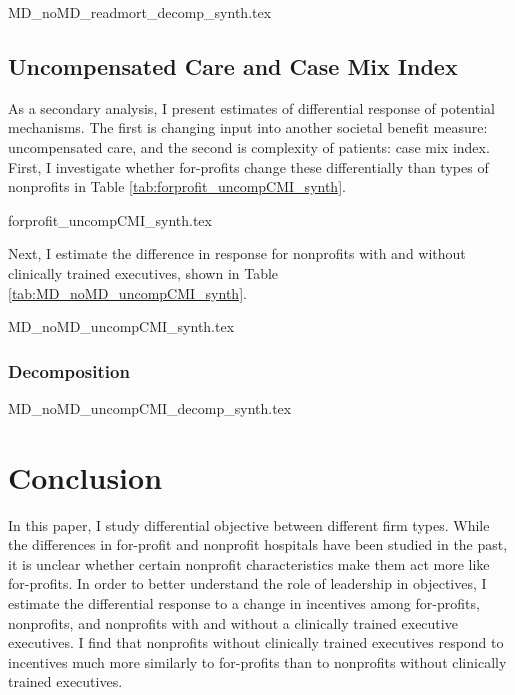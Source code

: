 \documentclass[12pt]{article}
\begin{document}
    {MD_noMD_readmort_decomp_synth.tex}

     


    \subsection{Uncompensated Care and Case Mix Index}

    As a secondary analysis, I present estimates of differential response of potential mechanisms. The first is changing input into another societal benefit measure: uncompensated care, and the second is complexity of patients: case mix index. First, I investigate whether for-profits change these differentially than types of nonprofits in Table \ref{tab:forprofit_uncompCMI_synth}. 

    {forprofit_uncompCMI_synth.tex}

    Next, I estimate the difference in response for nonprofits with and without clinically trained executives, shown in Table \ref{tab:MD_noMD_uncompCMI_synth}. 

    {MD_noMD_uncompCMI_synth.tex}

    \subsubsection{Decomposition}

    {MD_noMD_uncompCMI_decomp_synth.tex}
    

    \section{Conclusion}

    In this paper, I study differential objective between different firm types. While the differences in for-profit and nonprofit hospitals have been studied in the past, it is unclear whether certain nonprofit characteristics make them act more like for-profits. In order to better understand the role of leadership in objectives, I estimate the differential response to a change in incentives among for-profits, nonprofits, and nonprofits with and without a clinically trained executive executives. I find that nonprofits without clinically trained executives respond to incentives much more similarly to for-profits than to nonprofits without clinically trained executives.

	
	\newpage

    \printbibliography
\end{document}
